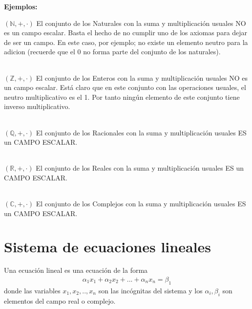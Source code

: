 \textbf{Ejemplos:}




$\left( \mathbb{N},+ ,\cdot \right) $
El conjunto de los Naturales con la suma y multiplicación usuales NO es un campo escalar.
Basta el hecho de no cumplir uno de los axiomas para dejar de ser un campo. En este caso, por ejemplo; no existe un elemento neutro para la adicion (recuerde que el 0 no forma parte del conjunto de los naturales).

~\\
$\left( \mathbb{Z},+ ,\cdot \right) $ 
El conjunto de los Enteros con la suma y multiplicación usuales NO es un campo escalar.
Está claro que en este conjunto con las operaciones usuales, el neutro multiplicativo es el 1. Por tanto ningún elemento de este conjunto tiene inverso multiplicativo.

~\\
$\left( \mathbb{Q},+ ,\cdot \right) $ 
El conjunto de los Racionales con la suma y multiplicación usuales ES un CAMPO ESCALAR.

~\\
$\left( \mathbb{R},+ ,\cdot \right) $ 
El conjunto de los Reales con la suma y multiplicación usuales ES un CAMPO ESCALAR.

~\\
$\left( \mathbb{C},+ ,\cdot \right) $ 
El conjunto de los Complejos con la suma y multiplicación usuales ES un CAMPO ESCALAR.


\section{Sistema de ecuaciones lineales}

Una ecuación lineal es una ecuación de la forma
\begin{align*}
\alpha_1 x_1+\alpha_2 x_2+...+\alpha_n x_n=\beta_1
\end{align*} 
donde las variables $x_1, x_2, .., x_n$ son las incógnitas del sistema y los $\alpha_i, \beta_i$ son elementos del campo real o complejo.


